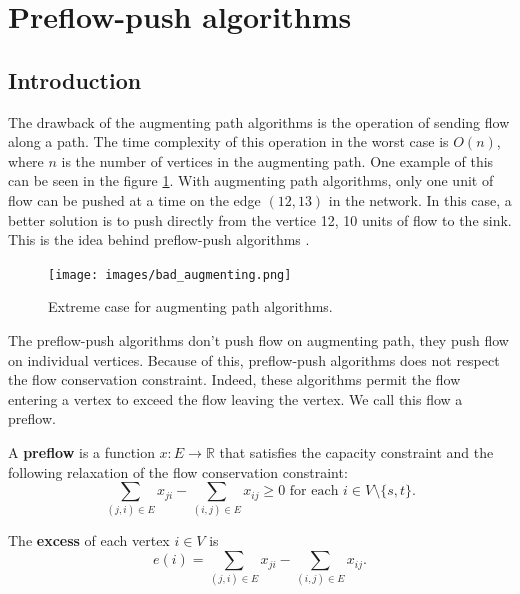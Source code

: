 \section{Preflow-push algorithms}
\label{sec:preflow}

\subsection{Introduction}

The drawback of the augmenting path algorithms is the operation of sending flow along a path. The time complexity of this operation in the worst case is $O(n)$, where $n$ is the number of vertices in the augmenting path. One example of this  can be seen in the figure \ref{img:bad_augmenting}. With augmenting path algorithms, only one unit of flow can be pushed at a time on the edge $(12, 13)$ in the network. In this case, a better solution is to push directly from the vertice 12, 10 units of flow to the sink. This is the idea behind preflow-push algorithms \cite{preflowpush}.

\begin{figure}[H]
\centering
\texttt{[image: images/bad\_augmenting.png]}
\caption{Extreme case for augmenting path algorithms.}
\label{img:bad_augmenting}
\end{figure}

The preflow-push algorithms don't push flow on augmenting path, they push flow on individual vertices. Because of this, preflow-push algorithms does not respect the flow conservation constraint. Indeed, these algorithms permit the flow entering a vertex to exceed the flow leaving the vertex. We call this flow a preflow.

\begin{definition}
\label{preflow}
A \textbf{preflow} is a function $x: E \to \mathbb{R}$ that satisfies the capacity constraint and the following relaxation of the flow conservation constraint:
$$\sum\limits_{(j,i) \in E} x_{ji} - \sum\limits_{(i,j) \in E} x_{ij} \geq 0 \text{	for each } i \in V \setminus \{s, t\}.$$
\end{definition}

\begin{definition}
\label{excess}
The \textbf{excess} of each vertex $i \in V$ is 
$$e(i) = \sum\limits_{(j,i) \in E} x_{ji} - \sum\limits_{(i,j) \in E} x_{ij}.$$
\end{definition}

